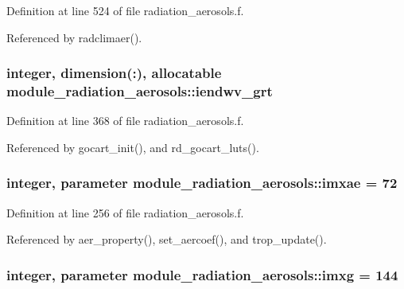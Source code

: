 Definition at line 524 of file radiation\+\_\+aerosols.\+f.



Referenced by radclimaer().

\subsubsection[{\texorpdfstring{iendwv\+\_\+grt}{iendwv_grt}}]{\setlength{\rightskip}{0pt plus 5cm}integer, dimension(\+:), allocatable module\+\_\+radiation\+\_\+aerosols\+::iendwv\+\_\+grt\hspace{0.3cm}{\ttfamily [private]}}\hypertarget{namespacemodule__radiation__aerosols_ac755c4235327053fff060ffa3b2ee2a3}{}\label{namespacemodule__radiation__aerosols_ac755c4235327053fff060ffa3b2ee2a3}


Definition at line 368 of file radiation\+\_\+aerosols.\+f.



Referenced by gocart\+\_\+init(), and rd\+\_\+gocart\+\_\+luts().

\subsubsection[{\texorpdfstring{imxae}{imxae}}]{\setlength{\rightskip}{0pt plus 5cm}integer, parameter module\+\_\+radiation\+\_\+aerosols\+::imxae = 72\hspace{0.3cm}{\ttfamily [private]}}\hypertarget{namespacemodule__radiation__aerosols_a52cda855a397136f75768d205292ddbb}{}\label{namespacemodule__radiation__aerosols_a52cda855a397136f75768d205292ddbb}


Definition at line 256 of file radiation\+\_\+aerosols.\+f.



Referenced by aer\+\_\+property(), set\+\_\+aercoef(), and trop\+\_\+update().

\subsubsection[{\texorpdfstring{imxg}{imxg}}]{\setlength{\rightskip}{0pt plus 5cm}integer, parameter module\+\_\+radiation\+\_\+aerosols\+::imxg = 144\hspace{0.3cm}{\ttfamily [private]}}\hypertarget{namespacemodule__radiation__aerosols_aa7b2e0e1d0669af4efc75cb32301f1f1}{}\label{namespacemodule__radiation__aerosols_aa7b2e0e1d0669af4efc75cb32301f1f1}


